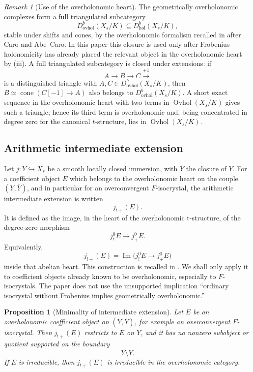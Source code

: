 \documentclass[11pt]{amsart}
\theoremstyle{plain}
\newtheorem{proposition}{Proposition}[section]
\theoremstyle{definition}
\theoremstyle{remark}
\newtheorem{remark}{Remark}[section]
\newcommand{\Ovhol}{\operatorname{Ovhol}}
\begin{document}
\begin{remark}[Use of the overholonomic heart]
\label{rem:ovhol-heart-use}
The geometrically overholonomic complexes form a full triangulated subcategory
\[
  D^b_{\mathrm{ovhol}}(X_s/K)\subseteq D^b_{\mathrm{hol}}(X_s/K),
\]
stable under shifts and cones, by the overholonomic formalism recalled in
\cite[\S2.1, first paragraphs]{HuygheSchmidtIntermediate} after Caro and Abe--Caro.  In this
paper this closure is used only after Frobenius holonomicity has already placed
the relevant object in the overholonomic heart by \textup{(iii)}.
A full triangulated subcategory is closed under extensions: if
\[
  A\longrightarrow B\longrightarrow C\xrightarrow{+1}
\]
is a distinguished triangle with \(A,C\in D^b_{\mathrm{ovhol}}(X_s/K)\), then
\(B\simeq\operatorname{cone}(C[-1]\to A)\) also belongs to
\(D^b_{\mathrm{ovhol}}(X_s/K)\). A short exact sequence in the overholonomic
heart with two terms in \(\Ovhol(X_s/K)\) gives such a triangle; hence its third
term is overholonomic and, being concentrated in degree zero for the canonical
\(t\)-structure, lies in \(\Ovhol(X_s/K)\).
\end{remark}

\subsection{Arithmetic intermediate extension}

Let \(j:Y\hookrightarrow X_s\) be a smooth locally closed immersion, with
\(\overline Y\) the closure of \(Y\). For a coefficient object \(E\) which belongs to the overholonomic heart on the
couple \((Y,\overline Y)\), and in particular for an overconvergent
\(F\)-isocrystal, the arithmetic intermediate extension is written
\[
  j_{!+}(E).
\]
It is defined as the image, in the heart of the overholonomic t-structure, of
the degree-zero morphism
\[
  j^0_!E\longrightarrow j^0_+E.
\]
Equivalently,
\[
  j_{!+}(E)=\operatorname{Im}\bigl(j^0_!E\to j^0_+E\bigr)
\]
inside that abelian heart. This construction is recalled in
\cite[\S2.2, definition of \(u_{!+}\)]{HuygheSchmidtIntermediate}.  We shall only apply it to
coefficient objects already known to be overholonomic, especially to
\(F\)-isocrystals.  The paper does not use the unsupported implication
``ordinary isocrystal without Frobenius implies geometrically overholonomic.''

\begin{proposition}[Minimality of intermediate extension]
\label{prop:intermediate-minimality-standard}
Let \(E\) be an overholonomic coefficient object on \((Y,\overline Y)\), for
example an overconvergent \(F\)-isocrystal. Then \(j_{!+}(E)\) restricts to
\(E\) on \(Y\), and it has no nonzero subobject or quotient supported on the
boundary
\[
  \overline Y\setminus Y.
\]
If \(E\) is irreducible, then \(j_{!+}(E)\) is irreducible in the
overholonomic category.
\end{proposition}
\end{document}
